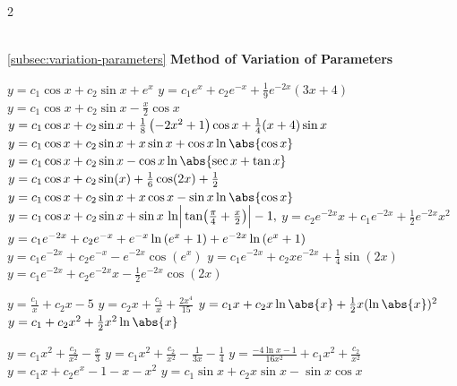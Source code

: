 \begin{multicols}{2}\scriptsize
	\begin{Answer}[ref={EX33}]\\
\ref{subsec:variation-parameters} \textbf{Method of Variation of Parameters}
		\Question \label{3-3-1a}
		\begin{tasks}
			\task \(y= c_1 \cos x+c_2 \sin x +e^x\)
			\task \(y=c_1 e^x+c_2 e^{-x}+\frac{1}{9} e^{-2 x} (3 x+4)\)
			\task \(y=c_1\cos x+c_2 \sin x-\frac{x}{2} \cos x \)
			\task \(y= c_1\cos x+c_2\sin x\\+ \frac{1}{8} \left(-2 x^2+1\right) \cos x
			+\frac{1}{4} (x+4) \sin x\)
			\task \(y=c_1 \cos x+c_2 \sin x\\+x \sin x+\cos x \ln \abs{\cos x}\)
			\task \(y=c_1 \cos x+c_2 \sin x\\-\cos x \ln\abs{\sec x + \tan x}\)
			\task \(y=c_1 \cos x+ c_2 \sin (x)\\+\frac{1}{6} \cos (2 x)+\frac12\)
			\task \(y= c_1 \cos x+c_2\sin x\\ +x \cos x - \sin x \ln\abs{\cos x}\)
			\task \(y=c_1 \cos x+c_2 \sin x\\+\sin x\, \ln\!\Big|\tan\!\big(\frac{\pi}{4} + \frac{x}{2}\big)\Big|- 1,\)
			\task \(y=c_2 e^{-2 x} x+c_1 e^{-2 x}+\frac{1}{2} e^{-2 x} x^2\)
			\task 	\(y=c_1 e^{-2 x}+c_2 e^{-x}\\+ e^{-x} \ln \left(e^x+1\right)+e^{-2 x}\ln\left(e^x+1\right)\)
			\task \(y=c_1 e^{-2 x}+c_2 e^{-x}-e^{-2 x} \cos \left(e^x\right)\)
			\task \(y=c_1 e^{-2 x}+c_2x e^{-2 x}+\frac{1}{4} \sin (2 x) \)
			\task \(y=c_1 e^{-2 x}+c_2 e^{-2 x} x-\frac{1}{2} e^{-2 x} \cos (2 x)\)
		\end{tasks} 
		
		
	\Question \label{3-3-2a}
	\begin{tasks}	
		\task \(y=\frac{c_1}{x}+c_2 x-5\)
		\task \(y=c_2 x+\frac{c_1}{x}+\frac{2 x^4}{15}\)
		\task \(y= c_1 x+c_2 x \ln\abs{x}+ \frac{1}{2} x (\ln\abs{x})^2\)
		\task \(y=c_1+c_2 x^2+\frac{1}{2} x^2 \ln\abs{x}\)
	\end{tasks}
	
		\Question \label{3-3-3a}
	\begin{tasks}	
		\task \(y=c_1 x^2+\frac{c_2}{x^2}-\frac{x}{3}\)
		\task \(y=c_1 x^2+\frac{c_2}{x^2}-\frac{1}{3 x}-\frac{1}{4}\)
		\task \(y=\frac{-4 \ln x -1}{16 x^2}+c_1 x^2+\frac{c_2}{x^2}\)
		\task \(y= c_1 x+c_2 e^x-1-x-x^2\)
		\task \( y = c_1 \sin x+c_2 x \sin x-\sin x \cos x\)
	\end{tasks}
	

\end{Answer}
\end{multicols}
